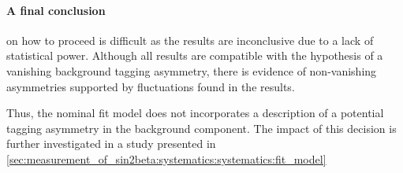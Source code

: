 \paragraph{A final conclusion} on how to proceed is difficult as the results are
inconclusive due to a lack of statistical power. Although all results are
compatible with the hypothesis of a vanishing background tagging asymmetry,
there is evidence of non-vanishing asymmetries supported by fluctuations found
in the results.

Thus, the nominal fit model does not incorporates a description of a potential
tagging asymmetry in the background component. The impact of this decision is
further investigated in a \ToyMC study presented in
\cref{sec:measurement_of_sin2beta:systematics:systematics:fit_model}
